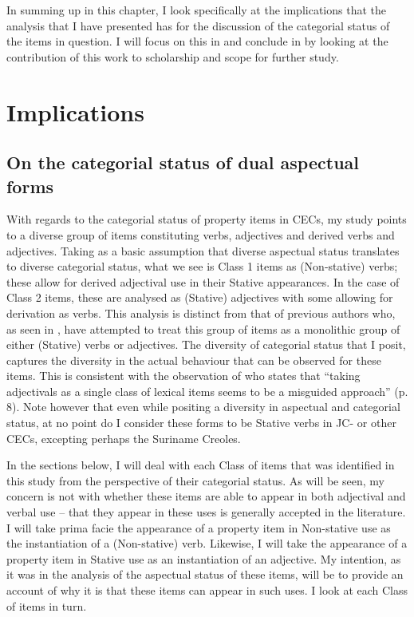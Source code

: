 In summing up in this chapter, I look specifically at the implications that the analysis that I have presented has for the discussion of the categorial status of the items in question. I will focus on this in  and conclude in  by looking at the contribution of this work to scholarship and scope for further study. 

\section{Implications}\label{sec:6.1}

 
\subsection{On the categorial status of dual aspectual forms }\label{sec:6.1.1}

With regards to the categorial status of property items in CECs, my study points to a diverse group of items constituting verbs, adjectives and derived verbs and adjectives. Taking as a basic assumption that diverse aspectual status translates to diverse categorial status, what we see is Class 1 items as (Non-stative) verbs; these allow for derived adjectival use in their Stative appearances. In the case of Class 2 items, these are analysed as (Stative) adjectives with some allowing for derivation as verbs. This analysis is distinct from that of previous authors who, as seen in , have attempted to treat this group of items as a monolithic group of either (Stative) verbs or adjectives. The diversity of categorial status that I posit, captures the diversity in the actual behaviour that can be observed for these items. This is consistent with the observation of \citet{Kouwenberg1996} who states that “taking adjectivals as a single class of lexical items seems to be a misguided approach” (p. 8). Note however that even while positing a diversity in aspectual and categorial status, at no point do I consider these forms to be Stative verbs in JC- or other CECs, excepting perhaps the Suriname Creoles. 

In the sections below, I will deal with each Class of items that was identified in this study from the perspective of their categorial status. As will be seen, my concern is not with whether these items are able to appear in both adjectival and verbal use -- that they appear in these uses is generally accepted in the literature. I will take prima facie the appearance of a property item in Non-stative use as the instantiation of a (Non-stative) verb. Likewise, I will take the appearance of a property item in Stative use as an instantiation of an adjective. My intention, as it was in the analysis of the aspectual status of these items, will be to provide an account of why it is that these items can appear in such uses. I look at each Class of items in turn.

